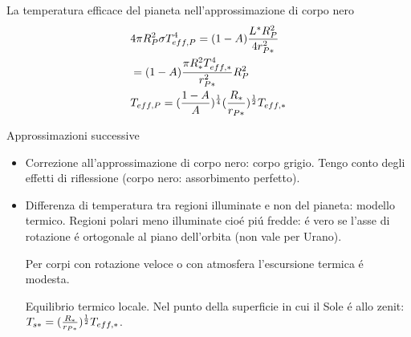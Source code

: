La temperatura efficace del pianeta nell'approssimazione di corpo nero
\begin{align*}
&4\pi R_P^2\sigma T_{eff,P}^4=(1-A)\frac{L^*R_P^2}{4r_{P*}^2}\\
&=(1-A)\frac{\pi R_*^2T_{eff,*}^4}{r_{P*}^2}R_P^2\\
&T_{eff,P}=(\frac{1-A}{A})^{\frac{1}{4}}(\frac{R_*}{r_{P*}})^{\frac{1}{2}}T_{eff,*}
\end{align*}

Approssimazioni successive
\begin{itemize}
    \item Correzione all'approssimazione di corpo nero: corpo grigio. Tengo conto degli effetti di riflessione (corpo nero: assorbimento perfetto).
    \item Differenza di temperatura tra regioni illuminate e non del pianeta: modello termico. Regioni polari meno illuminate cio\'e pi\'u fredde: \'e vero se l'asse di rotazione \'e ortogonale al piano dell'orbita (non vale per Urano).
    
    Per corpi con rotazione veloce o con atmosfera l'escursione termica \'e modesta.
    
    Equilibrio termico locale. Nel punto della superficie in cui il Sole \'e allo zenit: $T_{s*}=(\frac{R_*}{r_{P*}})^{\frac{1}{2}}T_{eff,*}$.
\end{itemize}
